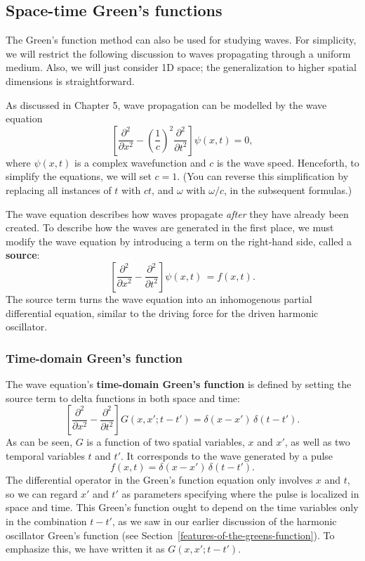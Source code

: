 \documentclass[10pt,a4paper]{article}
\begin{document}
\subsection{Space-time Green's functions}
\label{space-time-greens-functions}

The Green's function method can also be used for studying waves. For
simplicity, we will restrict the following discussion to waves
propagating through a uniform medium.  Also, we will just consider 1D
space; the generalization to higher spatial dimensions is
straightforward.

As discussed in Chapter 5, wave propagation can be modelled by the
wave equation
\begin{equation}
\left[\frac{\partial^2}{\partial x^2} - \left(\frac{1}{c}\right)^2 \frac{\partial^2}{\partial t^2} \right] \psi(x,t) = 0,
\end{equation}
where $\psi(x,t)$ is a complex wavefunction and $c$ is the wave
speed. Henceforth, to simplify the equations, we will set $c = 1$.
(You can reverse this simplification by replacing all instances of $t$
with $c t$, and $\omega$ with $\omega/c$, in the subsequent
formulas.)

The wave equation describes how waves propagate \emph{after} they have
already been created. To describe how the waves are generated in the
first place, we must modify the wave equation by introducing a term on
the right-hand side, called a \textbf{source}:
\begin{equation}
\left[\frac{\partial^2}{\partial x^2} - \frac{\partial^2}{\partial t^2} \right] \psi(x,t)\, = f(x,t).
\end{equation}
The source term turns the wave equation into an inhomogenous partial
differential equation, similar to the driving force for the driven
harmonic oscillator.

\subsubsection{Time-domain Green's function}
\label{time-domain-greens-function}

The wave equation's \textbf{time-domain Green's function} is defined
by setting the source term to delta functions in both space and time:
\begin{equation}
\left[\frac{\partial^2}{\partial x^2} - \frac{\partial^2}{\partial t^2} \right] G(x,x';t-t') = \delta(x-x')\, \delta(t-t').
\end{equation}
As can be seen, $G$ is a function of two spatial variables, $x$ and
$x'$, as well as two temporal variables $t$ and $t'$. It
corresponds to the wave generated by a pulse
\begin{equation}
f(x,t) = \delta(x-x')\,\delta(t-t').
\end{equation}
The differential operator in the Green's function equation only
involves $x$ and $t$, so we can regard $x'$ and $t'$ as parameters
specifying where the pulse is localized in space and time. This
Green's function ought to depend on the time variables only in the
combination $t-t'$, as we saw in our earlier discussion of the
harmonic oscillator Green's function (see
Section~\ref{features-of-the-greens-function}). To emphasize this, we
have written it as $G(x,x';t-t')$.
\end{document}
